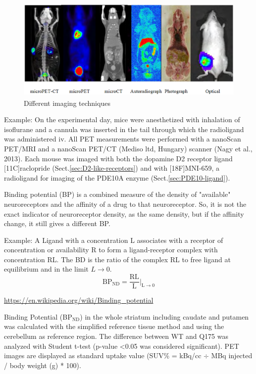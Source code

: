 \begin{figure}[hbt]
  \centerline{\includegraphics[height=5cm,
    angle=0]{./images/preclincal-imaging.eps}}
\caption{Different imaging techniques}
\label{fig:preclincal-imaging}
\end{figure}


Example: On the experimental day, mice were anesthetized with inhalation of
isoflurane and a cannula was inserted in the tail through which the radioligand
was administered iv. All PET measurements were performed with a nanoScan
PET/MRI and a nanoScan PET/CT (Mediso ltd, Hungary) scanner (Nagy et al.,
2013). Each mouse was imaged with both the dopamine D2 receptor ligand
[11C]raclopride (Sect.\ref{sec:D2-like-receptors}) and with [18F]MNI-659, a
radioligand for imaging of the PDE10A enzyme (Sect.\ref{sec:PDE10-ligand}).

\begin{mdframed}
\label{sec:binding-potential}

Binding potential (BP) is a combined measure of the density of "available"
neuroreceptors and the affinity of a drug to that neuroreceptor.
So, it is not the exact indicator of neuroreceptor density, as the same density,
but if the affinity change, it still gives a different BP.

Example: A Ligand with a concentration L associates with a receptor of
concentration or availability R to form a ligand-receptor complex with concentration RL.
The BD is the ratio of the complex RL to free ligand at equilibrium and in the
limit $L \rightarrow 0$.
\begin{equation}
\text{BP}_{\text{ND}} = \frac{\text{RL}}{\text{L}}|_{\text{L}\rightarrow 0}
\end{equation}


\url{https://en.wikipedia.org/wiki/Binding_potential}
\end{mdframed}

Binding Potential (BP$_{\text{ND}}$) in the whole striatum including caudate and
putamen was calculated with the simplified reference tissue method and using the
cerebellum as reference region. The difference between WT and Q175 was analyzed
with Student t-test (p-value <0.05 was considered significant). PET images are
displayed as standard uptake value (SUV\% = kBq/cc $\div$ MBq injected / body
weight (g) * 100).



